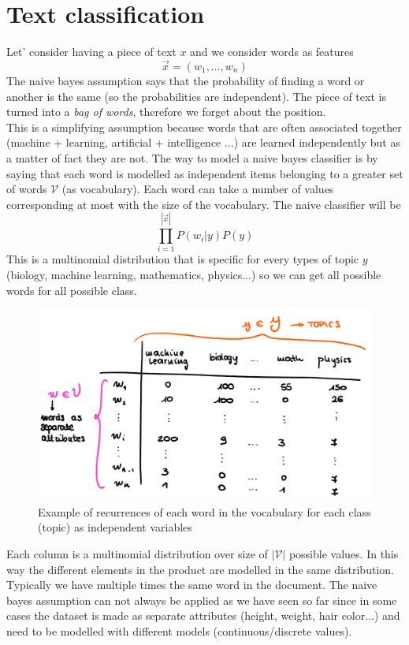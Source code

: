 \section{Text classification}
Let' consider having a piece of text $x$ and we consider words as features
\[
	\Vec{x}= (w_{1}, \dots, w_{n})
\]
The naive bayes assumption says that the probability of finding a word or
another is the same (so the probabilities are independent). The piece of text is
turned into a \textit{bag of words}, therefore we forget about the position.\\ This
is a simplifying assumption because words that are often associated together (machine
+ learning, artificial + intelligence ...) are learned independently but as a
matter of fact they are not. The way to model a naive bayes classifier is by saying
that each word is modelled as independent items belonging to a greater set of words
$\mathcal{V}$ (as vocabulary). Each word can take a number of values
corresponding at most with the size of the vocabulary. The naive classifier will
be
\[
	\prod_{i=1}^{|\Vec{x}|}P(w_{i}|y)P(y)
\]
This is a multinomial distribution that is specific for every types of topic $y$
(biology, machine learning, mathematics, physics...) so we can get all possible words
for all possible class.
\begin{figure}[H]
	\centering
	\includegraphics[scale=0.4]{
        images/11_NaiveBayes_textClassification.png
    }
	\caption{Example of recurrences of each word in the vocabulary for each class
	(topic) as independent variables}
	\label{fig:naive_text}
\end{figure}
Each column is a multinomial distribution over size of $|\mathcal{V}|$ possible
values. In this way the different elements in the product are modelled in the same
distribution. Typically we have multiple times the same word in the document. The
naive bayes assumption can not always be applied as we have seen so far since in
some cases the dataset is made as separate attributes (height, weight, hair
color...) and need to be modelled with different models (continuous/discrete values).